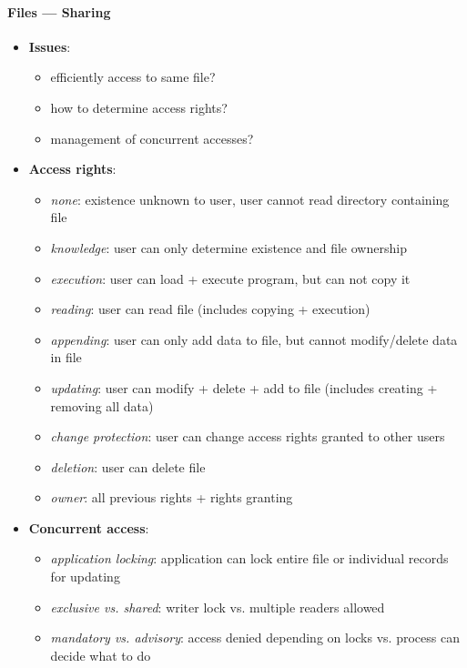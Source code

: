 \paragraph{Files --- Sharing}
\begin{itemize}
  \item \textbf{Issues}:
  \begin{itemize}
    \item efficiently access to same file?
    \item how to determine access rights?
    \item management of concurrent accesses?
  \end{itemize}
  \item \textbf{Access rights}:
  \begin{itemize}
    \item \emph{none}: existence unknown to user, user cannot read directory containing file 
    \item \emph{knowledge}: user can only determine existence and file ownership 
    \item \emph{execution}: user can load + execute program, but can not copy it 
    \item \emph{reading}: user can read file (includes copying + execution) 
    \item \emph{appending}: user can only add data to file, but cannot modify/delete data in file 
    \item \emph{updating}: user can modify + delete + add to file (includes creating + removing all data) 
    \item \emph{change protection}: user can change access rights granted to other users 
    \item \emph{deletion}: user can delete file 
    \item \emph{owner}: all previous rights + rights granting
  \end{itemize} 
  \item \textbf{Concurrent access}:
  \begin{itemize}
    \item \emph{application locking}: application can lock entire file or individual records for updating 
    \item \emph{exclusive vs. shared}: writer lock vs. multiple readers allowed 
    \item \emph{mandatory vs. advisory}: access denied depending on locks vs. process can decide what to do
  \end{itemize}
\end{itemize}